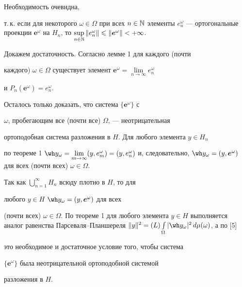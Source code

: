 \begin{pf}


Необходимость очевидна,


т.\,к. если для некоторого $\omega\in\Omega$ при всех $n\in\Bbb


N$ элементы $e^\omega_n$ --- ортогональные проекции $\boldsymbol


e^\omega$ на $H_n$, то $\sup\limits_{n\in\Bbb N}\|e^\omega_n\|\leqslant\|


\boldsymbol e^\omega\|<+\infty$.





Докажем достаточность. Согласно лемме 1 для каждого (почти


каждого) $\omega\in\Omega$ существует элемент $\boldsymbol e^\omega=


\lim\limits_{n\to\infty}e^\omega_n$


и $P_n(\boldsymbol e^\omega)=e^\omega_n$.


Осталось только доказать, что система $\{\boldsymbol e^\omega\}$ с


$\omega$, пробегающим все (почти все) $\Omega$, --- неотрицательная


ортоподобная система разложения в $H$. Для любого элемента $y\in H_n$


по теореме 1\; $\wh y_\omega=\lim\limits_{m\to\infty}(y,e^\omega_m


)=(y,e^\omega_n)$ и, следовательно, $\wh y_\omega=(y,\boldsymbol


e^\omega)$ для всех (почти всех) $\omega\in\Omega$.


Так как $\bigcup_{n=1}^\infty H_n$ всюду плотно в $H$, то для


любого $y\in H$\; $\wh y_\omega=(y,\boldsymbol e^\omega)$ для всех


(почти всех) $\omega\in\Omega$. По теореме 1 для любого элемента $y\in


H$ выполняется аналог равенства Парсеваля--Планшереля $\|y\|^2


=(L)\int\limits_\Omega|\wh y_\omega|^2\,d\mu(\omega)$, а по [5]


это необходимое и достаточное условие того, чтобы система


$\{\boldsymbol e^\omega\}$ была неотрицательной ортоподобной системой


разложения в $H$.


\end{pf}





